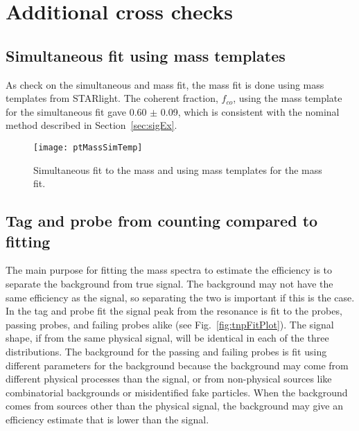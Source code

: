   \section{\label{sec:extraSys}Additional cross checks}
    \subsection{Simultaneous fit using mass templates}
      As check on the simultaneous \pt{} and mass fit, the mass fit is done
        using mass templates from STARlight.
      The coherent fraction, $f_{co}$, using the mass template for the 
        simultaneous fit gave 0.60 $\pm$ 0.09, which is consistent with the 
        nominal method described in Section~\ref{sec:sigEx}.
      \begin{figure}[!Hhbt]
        \centering
        \texttt{[image: ptMassSimTemp]}
        \caption{Simultaneous fit to the mass and \pt{} using mass templates
          for the mass fit. }
        \label{fig:simFitTemp}
      \end{figure}
  
    \subsection{Tag and probe from counting compared to fitting}
      The main purpose for fitting the mass spectra to estimate the efficiency
        is to separate the background from true signal. 
      The background may not have the same efficiency as the signal, so 
        separating the two is important if this is the case.
      In the tag and probe fit the signal peak from the \JPsi{} resonance
        is fit to the probes, passing probes, and failing probes alike (see
        Fig.~\ref{fig:tnpFitPlot}). 
      The signal shape, if from the same physical signal, will be 
        identical in each of the three distributions. 
      The background for the passing and failing probes is fit using 
        different parameters for the background because the background
        may come from different physical processes than the signal, or from 
        non-physical sources like combinatorial backgrounds or misidentified
        fake particles.
      When the background comes from sources other than the physical signal,
        the background may give an efficiency estimate that is lower than
        the signal. 
  

